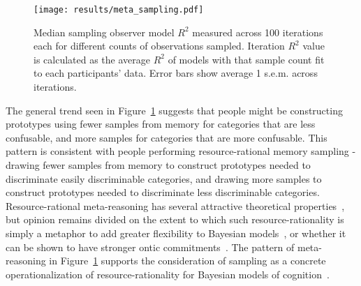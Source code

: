 \documentclass[10pt,letterpaper]{article}
\begin{document}
\begin{figure}[h!]
    \centering
    \texttt{[image: results/meta\_sampling.pdf]}
    \caption{Median sampling observer model $R^2$ measured across 100 iterations each for different counts of observations sampled. Iteration $R^2$ value is calculated as the average $R^2$ of models with that sample count fit to each participants' data. Error bars show average 1 s.e.m. across iterations.}
    \label{fig:meta_sampling}
\end{figure}

The general trend seen in Figure~\ref{fig:meta_sampling} suggests that people might be constructing prototypes using fewer samples from memory for categories that are less confusable, and more samples for categories that are more confusable. This pattern is consistent with people performing resource-rational memory sampling - drawing fewer samples from memory to construct prototypes needed to discriminate easily discriminable categories, and drawing more samples to construct prototypes needed to discriminate less discriminable categories. Resource-rational meta-reasoning has several attractive theoretical properties~\cite{griffiths2015rational}, but opinion remains divided on the extent to which such resource-rationality is simply a metaphor to add greater flexibility to Bayesian models~\cite{rahnev2020resource}, or whether it can be shown to have stronger ontic commitments~\cite{griffiths2015rational}. The pattern of meta-reasoning in Figure~\ref{fig:meta_sampling} supports the consideration of sampling as a concrete operationalization of resource-rationality for Bayesian models of cognition~\cite{srivastava2014frugal, sanborn2016bayesian}. 


\end{document}
